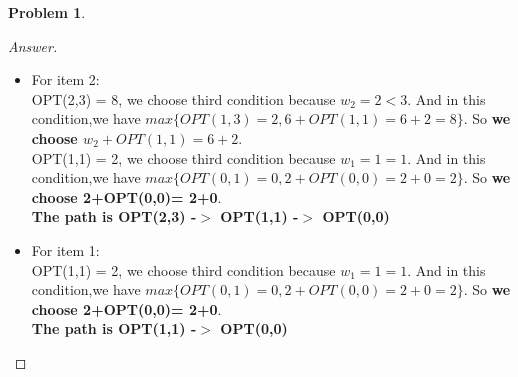 \documentclass[11pt]{article}
\theoremstyle{definition}
\theoremstyle{definition}
\newtheorem{required}{Problem}
\theoremstyle{definition}
\begin{document}
\begin{required}
\begin{proof}[Answer]
\begin{itemize}
\item For item 2:\\
OPT(2,3) = 8, we choose third condition because $w_2= 2 < 3$. And in this condition,we have $max\{OPT(1,3) = 2 ,6+OPT(1,1)= 6+2=8\}$. So \textbf{we choose $w_2 + OPT(1,1) = 6+2$}.\\
OPT(1,1) = 2, we choose third condition because $w_1= 1 = 1$. And in this condition,we have $max\{OPT(0,1) = 0 ,2+OPT(0,0)= 2+0=2\}$. So \textbf{we choose  2+OPT(0,0)= 2+0}.\\
\textbf{The path is OPT(2,3) -$>$ OPT(1,1) -$>$ OPT(0,0) }

\item For item 1:\\
OPT(1,1) = 2, we choose third condition because $w_1= 1 = 1$. And in this condition,we have $max\{OPT(0,1) = 0 ,2+OPT(0,0)= 2+0=2\}$. So \textbf{we choose  2+OPT(0,0)= 2+0}.\\
\textbf{The path is OPT(1,1) -$>$ OPT(0,0) }

\end{itemize}
\end{proof}


\end{required}
\end{document}
